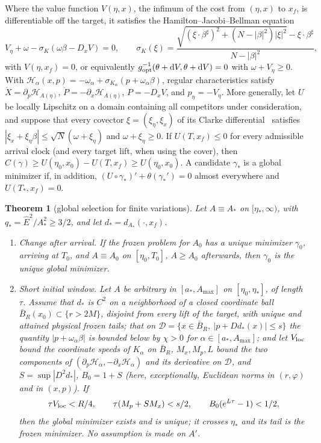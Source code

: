 \documentclass[aip,jmp,amsmath,amssymb,reprint]{revtex4-2}
\newcommand{\Ehat}{\hat E}
\newcommand{\dd}{\mathrm{d}}
\newcommand{\gopt}{g_{\rm opt}}
\theoremstyle{plain}
\newtheorem{theorem}{Theorem}
\theoremstyle{definition}
\begin{document}
Where the value function $V(\eta,x)$, the infimum of the cost from $(\eta,x)$ to $x_f$, is
differentiable off the target, it satisfies the Hamilton--Jacobi--Bellman equation
\begin{equation}
  V_\eta+\omega-\sigma_K(\omega\beta-D_xV)=0,\qquad
  \sigma_K(\xi)=\frac{\sqrt{(\xi\cdot\beta^\sharp)^2+(N-|\beta|^2)|\xi|^2}-\xi\cdot\beta^\sharp}{N-|\beta|^2},
  \label{eq:tau-eq-hjb}
\end{equation}
with $V(\eta,x_f)=0$, or equivalently $\gopt^{-1}(\theta+\dd V,\theta+\dd V)=0$ with
$\omega+V_\eta\ge0$. With $\mathcal H_\alpha(x,p)=-\omega_\alpha+\sigma_{K_\alpha}(p+\omega_\alpha\beta)$, regular
characteristics satisfy $\dot X=\partial_p\mathcal H_{A(\eta)}$, $\dot P=-\partial_x\mathcal H_{A(\eta)}$, $P=-D_xV$, and
$p_\eta=-V_\eta$. More generally, let $U$ be locally Lipschitz on a domain containing all competitors
under consideration, and suppose that every covector $\xi=(\xi_\eta,\xi_x)$ of its Clarke
differential~\cite[section~4.7]{Vinter2000} satisfies $|\xi_x+\xi_\eta\beta|\le\sqrt N(\omega+\xi_\eta)$ and $\omega+\xi_\eta\ge0$. If $U(T,x_f)\le0$ for every
admissible arrival clock (and every target lift, when using the cover), then
$C(\gamma)\ge U(\eta_0,x_0)-U(T,x_f)\ge U(\eta_0,x_0)$. A candidate $\gamma_*$ is a global minimizer if, in
addition, $(U\circ\gamma_*)'+\theta(\gamma_*')=0$ almost everywhere and $U(T_*,x_f)=0$.

\begin{theorem}[global selection for finite variations]\label{thm:tau-eq-select}
Let $A\equiv A_*$ on $[\eta_*,\infty)$, with $q_*=\Ehat^2/A_*^2\ge3/2$, and let $d_*=d_{A_*}(\cdot,x_f)$.
\begin{enumerate}
\item \emph{Change after arrival.} If the frozen problem for $A_0$ has a unique minimizer $\gamma_0$,
  arriving at $T_0$, and $A\equiv A_0$ on $[\eta_0,T_0]$, $A\ge A_0$ afterwards, then $\gamma_0$ is the unique
  global minimizer.
\item \emph{Short initial window.} Let $A$ be arbitrary in $[a_*,A_{\max}]$ on $[\eta_0,\eta_*]$, of
  length $\tau$. Assume that $d_*$ is $C^2$ on a neighborhood of a closed coordinate ball
  $\bar B_R(x_0)\subset\{r>2M\}$, disjoint from every lift of the target, with unique and attained
  physical frozen tails; that on
  $\mathcal D=\{x\in\bar B_R,\ |p+Dd_*(x)|\le s\}$ the quantity $|p+\omega_\alpha\beta|$ is bounded below by
  $\chi>0$ for $\alpha\in[a_*,A_{\max}]$; and let $V_{\rm loc}$ bound the coordinate speeds of $K_\alpha$ on
  $\bar B_R$, $M_x,M_p,L$ bound the two components of $(\partial_p\mathcal H_\alpha,-\partial_x\mathcal H_\alpha)$ and
  its derivative on $\mathcal D$, and $S=\sup|D^2d_*|$, $B_0=1+S$ (here, exceptionally, Euclidean norms
  in $(r,\varphi)$ and in $(x,p)$).
  If
  \[
    \tau V_{\rm loc}<R/4,\qquad \tau(M_p+SM_x)<s/2,\qquad B_0(e^{L\tau}-1)<1/2,
  \]
  then the global minimizer exists and is unique; it crosses $\eta_*$ and its tail is the frozen
  minimizer. No assumption is made on $A'$.
\end{enumerate}
\end{theorem}
\end{document}
